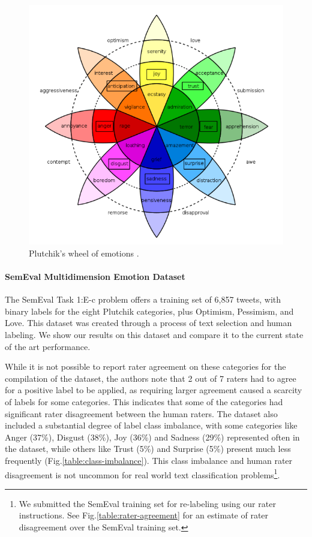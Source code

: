 \documentclass[letterpaper]{article} %
\begin{document}
\begin{figure}[t!] 
  \begin{center}
    \includegraphics[width=\columnwidth]{plutchik-wheel.png}
    \caption{Plutchik's wheel of emotions \protect\cite{Plutchik1979}.}
    \label{fig:Plutchik_wheel}
  \end{center}
\end{figure}


\paragraph{SemEval Multidimension Emotion Dataset}

The SemEval Task 1:E-c problem \protect\cite{SemEval2018Task1} offers a training set of 6,857 tweets, with binary labels for the eight Plutchik categories, plus Optimism, Pessimism, and Love. This dataset was created through a process of text selection and human labeling. We show our results on this dataset and compare it to the current state of the art performance.


While it is not possible to report rater agreement on these categories for the compilation of the dataset, the authors note that 2 out of 7 raters had to agree for a positive label to be applied, as requiring larger agreement caused a scarcity of labels for some categories. This indicates that some of the categories had significant rater disagreement between the human raters. The dataset also included a substantial degree of label class imbalance, with some categories like Anger (37\%), Disgust (38\%), Joy (36\%) and Sadness (29\%) represented often in the dataset, while others like Trust (5\%) and Surprise (5\%) present much less frequently (Fig.\ref{table:class-imbalance}). This class imbalance and human rater disagreement is not uncommon for real world text classification problems\footnote{We submitted the SemEval training set for re-labeling using our rater instructions. See Fig.\ref{table:rater-agreement} for an estimate of rater disagreement over the SemEval training set.}. 
\end{document}
